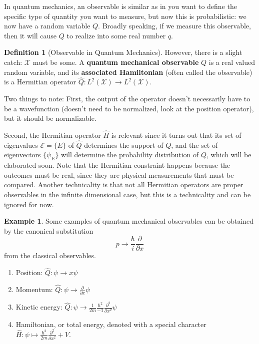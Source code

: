 \documentclass{article}
\theoremstyle{definition}
\newtheorem{example}{Example}[section]
\newtheorem{definition}{Definition}[section]
\begin{document}
    In quantum mechanics, an observable is similar as in you want to define the specific type of quantity you want to measure, but now this is probabilistic: we now have a random variable $Q$. Broadly speaking, if we measure this observable, then it will cause $Q$ to realize into some real number $q$. 

    \begin{definition}[Observable in Quantum Mechanics]
      However, there is a slight catch: $\mathcal{X}$ must be some. A \textbf{quantum mechanical observable} $Q$ is a real valued random variable, and its \textbf{associated Hamiltonian} (often called the observable) is a Hermitian operator $\hat{Q}: L^2 (\mathcal{X}) \rightarrow L^2 (\mathcal{X})$.  
    \end{definition}

    Two things to note: First, the output of the operator doesn't necessarily have to be a wavefunction (doesn't need to be normalized, look at the position operator), but it should be normalizable. 

    Second, the Hermitian operator $\hat{H}$ is relevant since it turns out that its set of eigenvalues $\mathcal{E} = \{E\}$ of $\hat{Q}$ determines the support of $Q$, and the set of eigenvectors $\{\psi_E\}$ will determine the probability distribution of $Q$, which will be elaborated soon. Note that the Hermitian constraint happens because the outcomes must be real, since they are physical measurements that must be compared. Another technicality is that not all Hermitian operators are proper observables in the infinite dimensional case, but this is a technicality and can be ignored for now.  

    \begin{example} 
      Some examples of quantum mechanical observables can be obtained by the canonical substitution 
      \begin{equation} 
        p \rightarrow \frac{\hbar}{i} \frac{\partial}{\partial x} 
      \end{equation}
      from the classical observables. 
        \begin{enumerate} 
          \item Position: $\hat{Q}: \psi \rightarrow x \psi$ 
          \item Momentum: $\hat{Q}: \psi \rightarrow \frac{\partial}{\partial x} \psi $ 
          \item Kinetic energy: $\hat{Q}: \psi \rightarrow \frac{1}{2m} \frac{\hbar^2}{-1} \frac{\partial^2}{\partial x^2} \psi$

          \item Hamiltonian, or total energy, denoted with a special character $\hat{H} : \psi \mapsto \frac{\hbar^2}{2m} \frac{\partial^2}{\partial x^2} + V$. 
        \end{enumerate} 
    \end{example}
\end{document}
